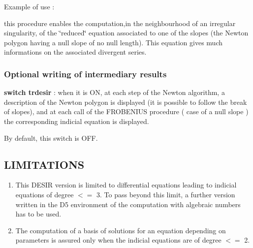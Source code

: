 Example of use : \par

this procedure enables the computation,in the neighbourhood of an irregular
singularity, of the \char`\"{}reduced\char`\"{} equation associated to one
of the slopes (the Newton polygon having a null slope of no null length). 
This equation gives much informations on the associated divergent series.

\subsubsection{Optional writing of intermediary results}

{\bf switch trdesir} : when it is ON, at each step of the Newton algorithm, a
description of the Newton polygon is displayed (it is possible to follow
the break of slopes), and at each call of the FROBENIUS procedure ( case of
a null slope ) the corresponding indicial equation is displayed. \par

By default, this switch is OFF.

\subsection{LIMITATIONS}

\begin{enumerate}
\item This DESIR version is limited to differential equations leading
to indicial equations of degree $<=$ 3. To pass beyond this limit, a further
version written in the D5 environment of the computation with algebraic
numbers has to be used.
\item The computation of a basis of solutions for an equation depending on
parameters is assured only when the indicial equations are of degree $<=$ 2.
\end{enumerate}








